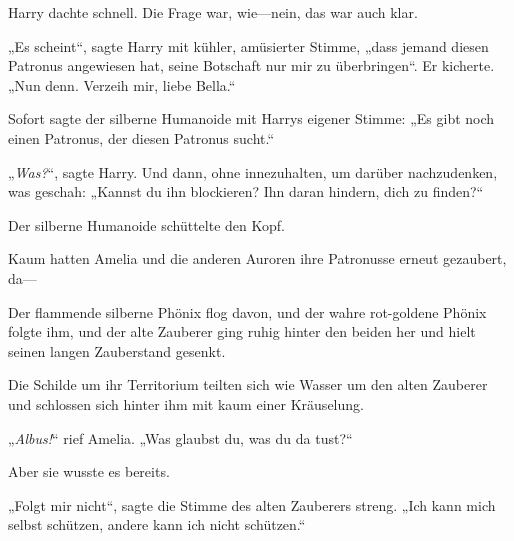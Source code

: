 Harry dachte schnell. Die Frage war, wie—nein, das war auch klar.

„Es scheint“, sagte Harry mit kühler, amüsierter Stimme, „dass jemand diesen Patronus angewiesen hat, seine Botschaft nur mir zu überbringen“. Er kicherte. „Nun denn. Verzeih mir, liebe Bella.“ 

Sofort sagte der silberne Humanoide mit Harrys eigener Stimme: „Es gibt noch einen Patronus, der diesen Patronus sucht.“

„\emph{Was?}“, sagte Harry. Und dann, ohne innezuhalten, um darüber nachzudenken, was geschah: „Kannst du ihn blockieren? Ihn daran hindern, dich zu finden?“

Der silberne Humanoide schüttelte den Kopf.

\later

Kaum hatten Amelia und die anderen Auroren ihre Patronusse erneut gezaubert, da—

Der flammende silberne Phönix flog davon, und der wahre rot-goldene Phönix folgte ihm, und der alte Zauberer ging ruhig hinter den beiden her und hielt seinen langen Zauberstand gesenkt.

Die Schilde um ihr Territorium teilten sich wie Wasser um den alten Zauberer und schlossen sich hinter ihm mit kaum einer Kräuselung.

„\emph{Albus!}“ rief Amelia. „Was glaubst du, was du da tust?“

Aber sie wusste es bereits.

„Folgt mir nicht“, sagte die Stimme des alten Zauberers streng. „Ich kann mich selbst schützen, andere kann ich nicht schützen.“

